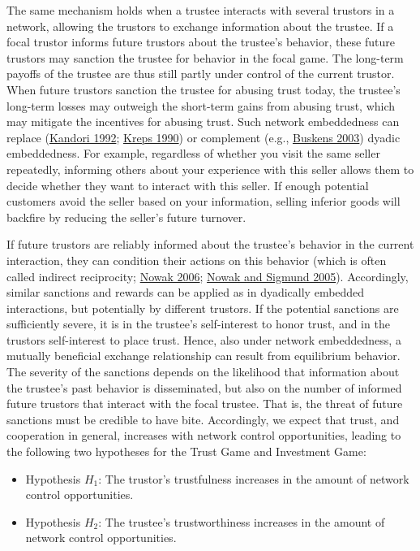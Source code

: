 \documentclass[
  11pt,
]{article}
\providecommand{\tightlist}{%
  \setlength{\itemsep}{0pt}\setlength{\parskip}{0pt}}
\begin{document}
The same mechanism holds when a trustee interacts with several trustors in a network, allowing the trustors to exchange information about the trustee.
If a focal trustor informs future trustors about the trustee's behavior, these future trustors may sanction the trustee for behavior in the focal game.
The long-term payoffs of the trustee are thus still partly under control of the current trustor.
When future trustors sanction the trustee for abusing trust today, the trustee's long-term losses may outweigh the short-term gains from abusing trust, which may mitigate the incentives for abusing trust.
Such network embeddedness can replace (\protect\hyperlink{ref-kandori_social_1992}{Kandori 1992}; \protect\hyperlink{ref-kreps_1990}{Kreps 1990}) or complement (e.g., \protect\hyperlink{ref-buskens_trust_2003}{Buskens 2003}) dyadic embeddedness.
For example, regardless of whether you visit the same seller repeatedly, informing others about your experience with this seller allows them to decide whether they want to interact with this seller.
If enough potential customers avoid the seller based on your information, selling inferior goods will backfire by reducing the seller's future turnover.

If future trustors are reliably informed about the trustee's behavior in the current interaction, they can condition their actions on this behavior (which is often called indirect reciprocity; \protect\hyperlink{ref-nowak_five_2006}{Nowak 2006}; \protect\hyperlink{ref-nowak_sigmund_evolution_2005}{Nowak and Sigmund 2005}).
Accordingly, similar sanctions and rewards can be applied as in dyadically embedded interactions, but potentially by different trustors.
If the potential sanctions are sufficiently severe, it is in the trustee's self-interest to honor trust, and in the trustors self-interest to place trust.
Hence, also under network embeddedness, a mutually beneficial exchange relationship can result from equilibrium behavior.
The severity of the sanctions depends on the likelihood that information about the trustee's past behavior is disseminated, but also on the number of informed future trustors that interact with the focal trustee.
That is, the threat of future sanctions must be credible to have bite.
Accordingly, we expect that trust, and cooperation in general, increases with network control opportunities, leading to the following two hypotheses for the Trust Game and Investment Game:

\begin{itemize}
\tightlist
\item
  Hypothesis \(H_1\): The trustor's trustfulness increases in the amount of network control opportunities.
\item
  Hypothesis \(H_2\): The trustee's trustworthiness increases in the amount of network control opportunities.
\end{itemize}
\end{document}
